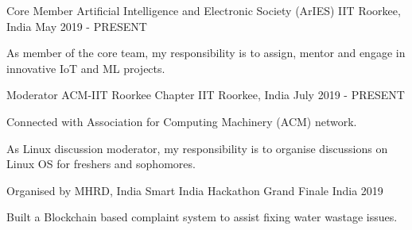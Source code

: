 

\begin{cventries}

  \cventry
    {Core Member } %
    {Artificial Intelligence and Electronic Society (ArIES)} %
    {IIT Roorkee, India} %
    {May 2019 - PRESENT} %
    {
      \begin{cvitems} %
        \item {As member of the core team, my responsibility is to assign, mentor and engage in innovative IoT and ML projects.}
      \end{cvitems}
    }

  \cventry
    {Moderator} %
    {ACM-IIT Roorkee Chapter} %
    {IIT Roorkee, India} %
    {July 2019 - PRESENT} %
    {
      \begin{cvitems} %
        \item {Connected with Association for Computing Machinery (ACM) network.}
        \item {As Linux discussion moderator, my responsibility is to organise discussions on Linux OS for freshers and sophomores.}
      \end{cvitems}
    }
  \cventry
    {Organised by MHRD, India } %
    {Smart India Hackathon Grand Finale} %
    {India} %
    {2019} %
    {
      \begin{cvitems} %
        \item {Built a Blockchain based complaint system to assist fixing water wastage issues.}
      \end{cvitems}
    }

\end{cventries}
